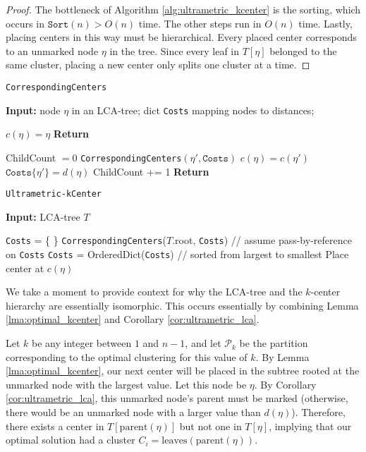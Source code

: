 \begin{proof}
    The bottleneck of Algorithm \ref{alg:ultrametric_kcenter} is the sorting, which occurs in $\texttt{Sort}(n) > O(n)$ time. The other steps run in $O(n)$
    time.  Lastly, placing centers in this way must be hierarchical. Every placed center corresponds to an unmarked node $\eta$ in the tree. Since every leaf in
    $T[\eta]$ belonged to the same cluster, placing a new center only splits one cluster at a time.

\end{proof}

\begin{algorithm}
\caption{\texttt{CorrespondingCenters}}\label{alg:corresp_centers}
\textbf{Input:} node $\eta$ in an LCA-tree; dict \texttt{Costs} mapping nodes to distances;
\begin{algorithmic}[1]
        \State $c(\eta) = \eta$
        \State \textbf{Return}
    \EndIf \vspace*{0.2cm}

    \State ChildCount $= 0$
        \State \texttt{CorrespondingCenters}$(\eta', \texttt{Costs})$
            \State $c(\eta) = c(\eta')$
        \Else
            \State $\texttt{Costs}\{\eta'\} = d(\eta)$
        \EndIf
        \State ChildCount += 1
    \EndFor
    \State \textbf{Return}
\end{algorithmic}
\end{algorithm}

\begin{algorithm}
    \caption{\texttt{Ultrametric-kCenter}}\label{alg:ultrametric_kcenter}
\textbf{Input:} LCA-tree $T$
\begin{algorithmic}[1]
    \State \texttt{Costs} = \{ \}
    \State \texttt{CorrespondingCenters}($T$.root, \texttt{Costs}) // assume pass-by-reference on \texttt{Costs}
    \State \texttt{Costs} = OrderedDict(\texttt{Costs}) // sorted from largest to smallest
        \State Place center at $c(\eta)$
    \EndFor
\end{algorithmic}
\end{algorithm}

We take a moment to provide context for why the LCA-tree and the $k$-center hierarchy are essentially isomorphic. This occurs essentially by combining Lemma \ref{lma:optimal_kcenter} and Corollary \ref{cor:ultrametric_lca}.
    
Let $k$ be any integer between $1$ and $n-1$, and let $\mathcal{P}_k$ be the partition corresponding to the optimal clustering for this value of $k$. By Lemma \ref{lma:optimal_kcenter}, our next center will be placed in the subtree rooted at the unmarked node with the largest value. Let this node be $\eta$. By Corollary \ref{cor:ultrametric_lca}, this unmarked node's parent must be marked (otherwise, there would be an unmarked node with a larger value than $d(\eta)$). Therefore, there exists a center in $T[\text{parent}(\eta)]$ but not one in $T[\eta]$, implying that our optimal solution had a cluster $C_i = \text{leaves}(\text{parent}(\eta))$.

